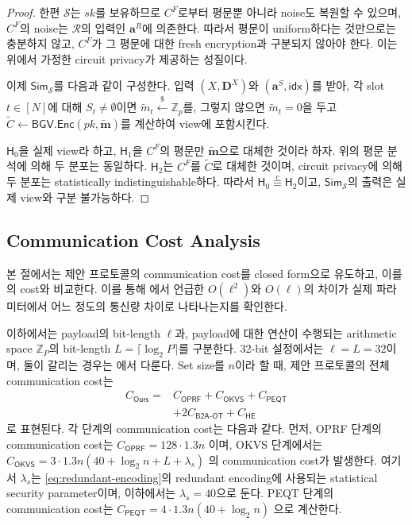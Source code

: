 \documentclass[sigconf,anonymous,review]{acmart}
\newcommand{\Snd}{\mathcal{S}}
\newcommand{\Rcv}{\mathcal{R}}
\newcommand{\Z}{\mathbb{Z}}
\begin{document}
\begin{proof}
한편 $\Snd$는 $sk$를 보유하므로 $C^F$로부터 평문뿐 아니라 noise도 복원할 수
있으며, $C^F$의 noise는 $\Rcv$의 입력인 $\mathbf{a}^R$에 의존한다. 따라서
평문이 uniform하다는 것만으로는 충분하지 않고, $C^F$가 그 평문에 대한 fresh
encryption과 구분되지 않아야 한다. 이는 위에서 가정한 circuit privacy가
제공하는 성질이다.

이제 $\mathsf{Sim}_\Snd$를 다음과 같이 구성한다. 입력
$(X,\mathbf{D}^X)$와 $(\mathbf{a}^S,\mathsf{idx})$를 받아, 각 slot
$t\in[N]$에 대해 $S_t\neq\emptyset$이면
$\tilde m_t\xleftarrow{\$}\Z_p$를, 그렇지 않으면 $\tilde m_t=0$을 두고
$\tilde{C}\leftarrow\mathsf{BGV.Enc}(pk,\tilde{\mathbf{m}})$를 계산하여
view에 포함시킨다.

$\mathsf{H}_0$을 실제 view라 하고, $\mathsf{H}_1$을 $C^F$의 평문만
$\tilde{\mathbf{m}}$으로 대체한 것이라 하자. 위의 평문 분석에 의해 두
분포는 동일하다. $\mathsf{H}_2$는 $C^F$를 $\tilde C$로 대체한 것이며, circuit privacy에
의해 두 분포는 statistically indistinguishable하다. 따라서
$\mathsf{H}_0\stackrel{c}{\equiv}\mathsf{H}_2$이고, $\mathsf{Sim}_\Snd$의
출력은 실제 view와 구분 불가능하다.
\end{proof}

\subsection{Communication Cost Analysis}\label{sec:comm-analysis}
본 절에서는 제안 프로토콜의 communication cost를 closed form으로 유도하고,
이를 \cite{KLS26}의 cost와 비교한다. 이를 통해 에서 언급한
$O(\ell^2)$와 $O(\ell)$의 차이가 실제 파라미터에서 어느 정도의 통신량 차이로
나타나는지를 확인한다.

이하에서는 payload의 bit-length $\ell$과, payload에 대한 연산이 수행되는
arithmetic space $\Z_P$의 bit-length $L=\lceil\log_2 P\rceil$를 구분한다.
32-bit 설정에서는 $\ell=L=32$이며, 둘이 갈리는 경우는 에서
다룬다. Set size를 $n$이라 할 때, 제안 프로토콜의 전체 communication cost는
\[
\begin{aligned}
C_{\mathsf{Ours}}
={}&
C_{\mathsf{OPRF}}
+C_{\mathsf{OKVS}}
+C_{\mathsf{PEQT}} \\
&+2C_{\mathsf{B2A\mbox{-}OT}}
+C_{\mathsf{HE}}
\end{aligned}
\]
로 표현된다.
각 단계의 communication cost는 다음과 같다.
먼저, OPRF 단계의 communication cost는
$
C_{\mathsf{OPRF}}
=
128\cdot 1.3n
$
이며, OKVS 단계에서는
$
C_{\mathsf{OKVS}}
=
3\cdot 1.3n
\left(
40+\log_2 n+L+\lambda_s
\right)
$
의 communication cost가 발생한다.
여기서 $\lambda_s$는 \eqref{eq:redundant-encoding}의 redundant encoding에
사용되는 statistical security parameter이며, 이하에서는 $\lambda_s=40$으로
둔다.
PEQT 단계의 communication cost는
$
C_{\mathsf{PEQT}}
=
4\cdot 1.3n
\left(
40+\log_2 n
\right)
$
으로 계산한다.
\end{document}
